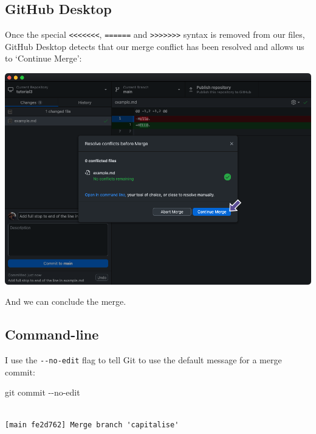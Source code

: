 \documentclass[
  letterpaper,
  DIV=11,
  numbers=noendperiod]{scrartcl}
\newenvironment{Shaded}{\begin{snugshade}}{\end{snugshade}}
\newcommand{\AttributeTok}[1]{\textcolor[rgb]{0.40,0.45,0.13}{#1}}
\newcommand{\FunctionTok}[1]{\textcolor[rgb]{0.28,0.35,0.67}{#1}}
\newcommand{\NormalTok}[1]{\textcolor[rgb]{0.00,0.23,0.31}{#1}}
\begin{document}
\subsection{GitHub Desktop}

Once the special
\texttt{\textless{}\textless{}\textless{}\textless{}\textless{}\textless{}\textless{}},
\texttt{======} and
\texttt{\textgreater{}\textgreater{}\textgreater{}\textgreater{}\textgreater{}\textgreater{}\textgreater{}}
syntax is removed from our files, GitHub Desktop detects that our merge
conflict has been resolved and allows us to `Continue Merge':

\includegraphics{images/image55.png}

And we can conclude the merge.

\subsection{Command-line}

I use the \texttt{-\/-no-edit} flag to tell Git to use the default
message for a merge commit:

\begin{Shaded}
\begin{Highlighting}[]

\FunctionTok{git}\NormalTok{ commit }\AttributeTok{{-}{-}no{-}edit}
\end{Highlighting}
\end{Shaded}

\begin{verbatim}

[main fe2d762] Merge branch 'capitalise'
\end{verbatim}
\end{document}
